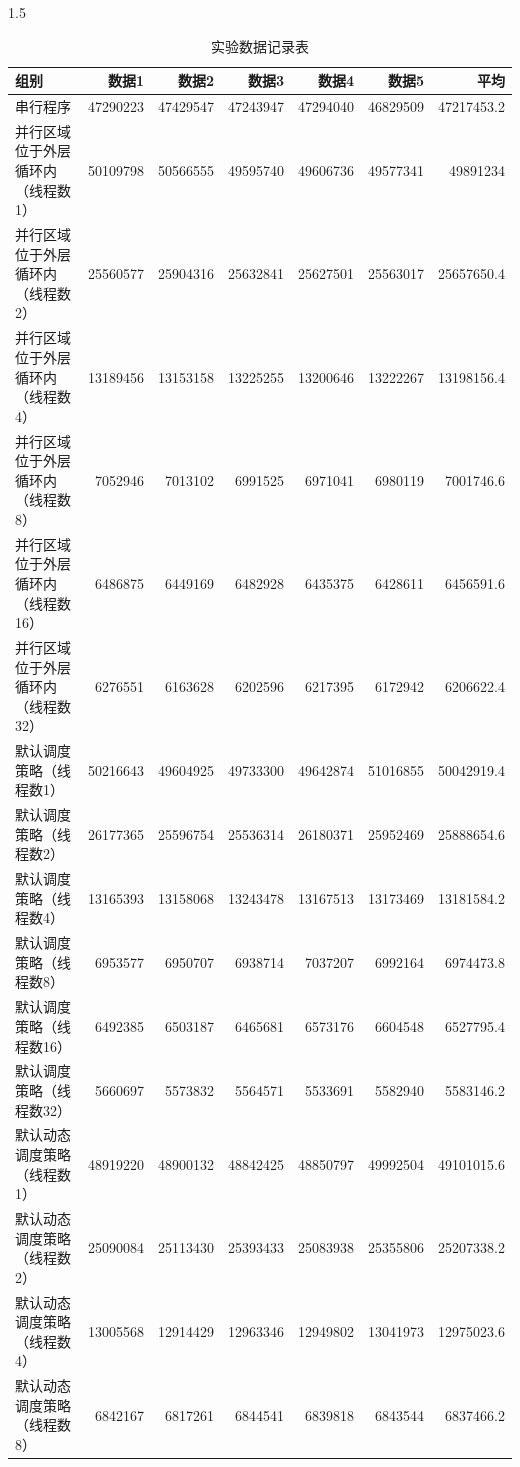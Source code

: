 \documentclass[zihao=-4]{ctexart}
\begin{document}
\begin{spacing}{1.5}
\begin{table}[H]
\tiny
\caption{实验数据记录表}
\centering
\begin{tabular}{lrrrrrr}
\hline  
\textbf{组别} & \textbf{数据1} & \textbf{数据2} & \textbf{数据3} & \textbf{数据4} & \textbf{数据5} & \textbf{平均}\\ 
\hline  
串行程序 & 47290223 & 47429547 & 47243947 & 47294040 & 46829509 & 47217453.2 \\
并行区域位于外层循环内（线程数1） & 50109798 & 50566555 & 49595740 & 49606736 & 49577341 & 49891234 \\
并行区域位于外层循环内（线程数2） & 25560577 & 25904316 & 25632841 & 25627501 & 25563017 & 25657650.4 \\
并行区域位于外层循环内（线程数4） & 13189456 & 13153158 & 13225255 & 13200646 & 13222267 & 13198156.4 \\
并行区域位于外层循环内（线程数8） & 7052946 & 7013102 & 6991525 & 6971041 & 6980119 & 7001746.6 \\
并行区域位于外层循环内（线程数16） & 6486875 & 6449169 & 6482928 & 6435375 & 6428611 & 6456591.6 \\
并行区域位于外层循环内（线程数32） & 6276551 & 6163628 & 6202596 & 6217395 & 6172942 & 6206622.4 \\
默认调度策略（线程数1） & 50216643 & 49604925 & 49733300 & 49642874 & 51016855 & 50042919.4 \\
默认调度策略（线程数2） & 26177365 & 25596754 & 25536314 & 26180371 & 25952469 & 25888654.6 \\
默认调度策略（线程数4） & 13165393 & 13158068 & 13243478 & 13167513 & 13173469 & 13181584.2 \\
默认调度策略（线程数8） & 6953577 & 6950707 & 6938714 & 7037207 & 6992164 & 6974473.8 \\
默认调度策略（线程数16） & 6492385 & 6503187 & 6465681 & 6573176 & 6604548 & 6527795.4 \\
默认调度策略（线程数32） & 5660697 & 5573832 & 5564571 & 5533691 & 5582940 & 5583146.2 \\
默认动态调度策略（线程数1） & 48919220 & 48900132 & 48842425 & 48850797 & 49992504 & 49101015.6 \\
默认动态调度策略（线程数2） & 25090084 & 25113430 & 25393433 & 25083938 & 25355806 & 25207338.2 \\
默认动态调度策略（线程数4） & 13005568 & 12914429 & 12963346 & 12949802 & 13041973 & 12975023.6 \\
默认动态调度策略（线程数8） & 6842167 & 6817261 & 6844541 & 6839818 & 6843544 & 6837466.2 \\

\end{tabular}
\end{table}
\end{spacing}
\end{document}
